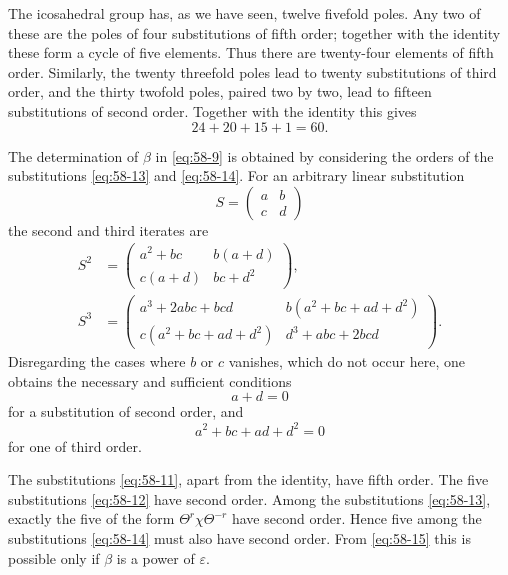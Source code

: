 \documentclass[11pt,a4paper]{book}
\newcommand{\eps}{\varepsilon}
\begin{document}
The icosahedral group has, as we have seen, twelve fivefold poles.  Any two of these are the poles of four substitutions of fifth order; together with the identity these form a cycle of five elements.  Thus there are twenty-four elements of fifth order.  Similarly, the twenty threefold poles lead to twenty substitutions of third order, and the thirty twofold poles, paired two by two, lead to fifteen substitutions of second order.  Together with the identity this gives
\[
 24+20+15+1=60.
\]

The determination of \(\beta\) in \eqref{eq:58-9} is obtained by considering the orders of the substitutions \eqref{eq:58-13} and \eqref{eq:58-14}.  For an arbitrary linear substitution
\[
 S=\begin{pmatrix}a&b\\c&d\end{pmatrix}
\]
the second and third iterates are
\begin{align*}
 S^2&=\begin{pmatrix}a^2+bc&b(a+d)\\c(a+d)&bc+d^2\end{pmatrix},\\
 S^3&=\begin{pmatrix}a^3+2abc+bcd&b(a^2+bc+ad+d^2)\\ c(a^2+bc+ad+d^2)&d^3+abc+2bcd\end{pmatrix}.
\end{align*}
Disregarding the cases where \(b\) or \(c\) vanishes, which do not occur here, one obtains the necessary and sufficient conditions
\begin{equation}\label{eq:58-15}
 a+d=0
\end{equation}
for a substitution of second order, and
\begin{equation}\label{eq:58-16}
 a^2+bc+ad+d^2=0
\end{equation}
for one of third order.

The substitutions \eqref{eq:58-11}, apart from the identity, have fifth order.  The five substitutions \eqref{eq:58-12} have second order.  Among the substitutions \eqref{eq:58-13}, exactly the five of the form \(\Theta^r\chi\Theta^{-r}\) have second order.  Hence five among the substitutions \eqref{eq:58-14} must also have second order.  From \eqref{eq:58-15} this is possible only if \(\beta\) is a power of \(\eps\).
\end{document}
